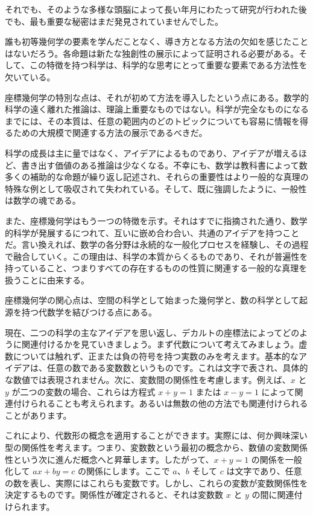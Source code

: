 \documentclass[a4paper,11pt,openany]{ltjsbook}
\begin{document}
それでも、そのような多様な頭脳によって長い年月にわたって研究が行われた後でも、最も重要な秘密はまだ発見されていませんでした。

誰も初等幾何学の要素を学んだことなく、導き方となる方法の欠如を感じたことはないだろう。各命題は新たな独創性の展示によって証明される必要がある。そして、この特徴を持つ科学は、科学的な思考にとって重要な要素である方法性を欠いている。

座標幾何学の特別な点は、それが初めて方法を導入したという点にある。数学的科学の遠く離れた推論は、理論上重要なものではない。科学が完全なものになるまでには、その本質は、任意の範囲内のどのトピックについても容易に情報を得るための大規模で関連する方法の展示であるべきだ。

科学の成長は主に量ではなく、アイデアによるものであり、アイデアが増えるほど、書き出す価値のある推論は少なくなる。不幸にも、数学は教科書によって数多くの補助的な命題が繰り返し記述され、それらの重要性はより一般的な真理の特殊な例として吸収されて失われている。そして、既に強調したように、一般性は数学の魂である。

また、座標幾何学はもう一つの特徴を示す。それはすでに指摘された通り、数学的科学が発展するにつれて、互いに嵌め合わ合い、共通のアイデアを持つことだ。言い換えれば、数学の各分野は永続的な一般化プロセスを経験し、その過程で融合していく。この理由は、科学の本質からくるものであり、それが普遍性を持っていること、つまりすべての存在するものの性質に関連する一般的な真理を扱うことに由来する。

座標幾何学の関心点は、空間の科学として始まった幾何学と、数の科学として起源を持つ代数学を結びつける点にある。

現在、二つの科学の主なアイデアを思い返し、デカルトの座標法によってどのように関連付けるかを見ていきましょう。まず代数について考えてみましょう。虚数については触れず、正または負の符号を持つ実数のみを考えます。基本的なアイデアは、任意の数である変数数というものです。これは文字で表され、具体的な数値では表現されません。次に、変数間の関係性を考慮します。例えば、$x$ と $y$ が二つの変数の場合、これらは方程式 $x + y = 1$ または $x - y = 1$ によって関連付けられることも考えられます。あるいは無数の他の方法でも関連付けられることがあります。

これにより、代数形の概念を適用することができます。実際には、何か興味深い型の関係性を考えます。つまり、変数数という最初の概念から、数値の変数関係性という次に進んだ概念へと昇華します。したがって、$x + y = 1$ の関係を一般化して $ax + by = c$ の関係にします。ここで $a$、$b$ そして $c$ は文字であり、任意の数を表し、実際にはこれらも変数です。しかし、これらの変数が変数関係性を決定するものです。関係性が確定されると、それは変数数 $x$ と $y$ の間に関連付けられます。
\end{document}
